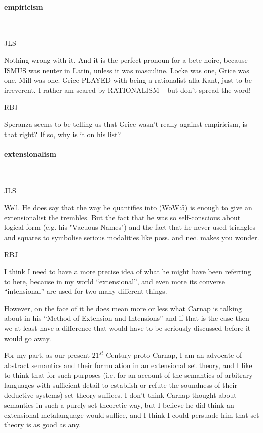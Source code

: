 \documentclass[10pt,titlepage]{book}
\begin{document}
\paragraph{empiricism}\ 

JLS

Nothing wrong with it. And it is the perfect pronoun for a bete 
 noire, because ISMUS was neuter in Latin, unless it was masculine. Locke 
was  one, Grice was one, Mill was one. Grice PLAYED with being a rationalist 
alla  Kant, just to be irreverent.
I rather am scared by RATIONALISM -- but 
don't  spread the word!
 
RBJ

Speranza seems to be telling us that Grice wasn't really against empiricism, is that right?
If so, why is it on his list?
 
\paragraph{extensionalism}\ 

JLS

Well. He does say that the way he quantifies into (WoW:5)  
is enough to give an extensionalist the trembles. But the fact that he was 
so  self-conscious about logical form (e.g. his "Vacuous Names") and the fact 
that  he never used triangles and squares to symbolise serious modalities 
like poss.  and nec. makes you wonder.

RBJ

I think I need to have a more precise idea of what he might have been referring to here, because in my world ``extensional'', and even more its converse ``intensional'' are used for two many different things.

However, on the face of it he does mean more or less what Carnap is talking about in his ``Method of Extension and Intensions'' and if that is the case then we at least have a difference that would have to be seriously discussed before it would go away.

For my part, as our present $21^{st}$ Century proto-Carnap, I am an advocate of abstract semantics and their formulation in an extensional set theory, and I like to think that for such purposes (i.e. for an account of the semantics of arbitrary languages with sufficient detail to establish or refute the soundness of their deductive systems) set theory suffices.
I don't think Carnap thought about semantics in such a purely set theoretic way, but I believe he did think an extensional metalanguage would suffice, and I think I could persuade him that set theory is as good as any.
\end{document}
